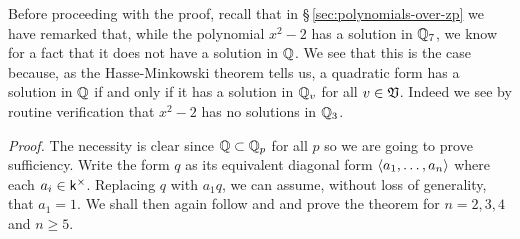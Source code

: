 Before proceeding with the proof, recall that in
\S\,\ref{sec:polynomials-over-zp} we have remarked that, while the polynomial
\(x^2 - 2\) has a solution in \(\mathbb{Q}_7\), we know for a fact that it does
not have a solution in \(\mathbb{Q}\). We see that this is the case because, as
the Hasse-Minkowski theorem tells us, a quadratic form has a solution in
\(\mathbb{Q}\) if and only if it has a solution in \(\mathbb{Q}_v\) for all \(v
\in \mathfrak{V}\). Indeed we see by routine verification that \(x^2 - 2\) has no
solutions in \(\mathbb{Q}_3\).


\emph{Proof.} The necessity is clear since \(\mathbb{Q} \subset \mathbb{Q}_p\)
for all \(p\) so we are going to prove sufficiency. Write the form \(q\) as its
equivalent diagonal form \(\langle a_1, \dots, a_n \rangle\) where each \(a_i \in
\mathsf{k}^{\times}\). Replacing \(q\) with \(a_1 q\), we can assume, without loss of
generality, that \(a_1 = 1\). We shall then again follow
\cite[pp.~41--44]{serre2012course} and \cite[pp.~102--104]{gerstein2008basic}
and prove the theorem for \(n = 2, 3, 4\) and \(n \geq 5.\)

